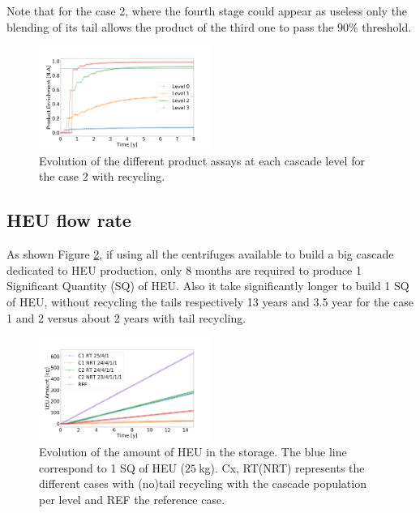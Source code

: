 \documentclass{anstrans}
\begin{document}
Note that for the case 2, where the fourth stage could appear as useless only the
blending of its tail allows the product of the third one to pass the $90\%$ threshold.

\begin{figure}[ht] %
  \centering
  \includegraphics[width=0.5\textwidth]{assay_case_2_rec.png}
  \caption{Evolution of the different product assays at each cascade level for
  the case 2 with recycling.}\label{fig:assay_c2_r}
\end{figure}


\subsection{HEU flow rate}
As shown Figure \ref{fig:heu_prod}, if using all the centrifuges available to
build a big cascade dedicated to HEU production, only 8 months are required to
produce 1 Significant Quantity (SQ) of HEU. Also it take significantly longer to
build 1 SQ of HEU, without recycling the tails respectively 13 years and 3.5 year
for the case 1 and 2 versus about 2 years with tail recycling.

\begin{figure}[ht] %
  \centering
  \includegraphics[width=0.5\textwidth]{HEU_prod.png} \caption{Evolution of the
  amount of HEU in the storage. The blue line correspond to 1 SQ of HEU
  ($25~$kg). Cx, RT(NRT) represents the different cases with (no)tail recycling
  with the cascade population per level and REF the reference
  case.}\label{fig:heu_prod}
\end{figure}
\end{document}
